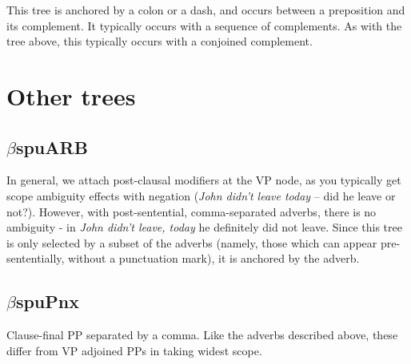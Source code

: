 This tree is anchored by a colon or a dash, and occurs between a 
preposition and its complement. It typically occurs with a sequence 
of complements. As with the tree above, this typically occurs with a 
conjoined complement. 
 
\beginsentences
{}\label{ex:459} 
\label{ex:460} 
\endsentences

 
\section{Other trees} 
 
\subsection{$\beta$spuARB} 
\label{post-adverb} 
 
In general, we attach post-clausal modifiers at the VP node, as you 
typically get scope ambiguity effects with negation ({\it John didn't leave today} -- did he leave or not?). However, with post-sentential, 
comma-separated adverbs, there is no ambiguity - in {\it John didn't leave, today} he definitely did not leave. Since this tree is only 
selected by a subset of the adverbs (namely, those which can appear 
pre-sententially, without a punctuation mark), it is anchored by the 
adverb. 
 
\beginsentences
{}\label{ex:461} 
\endsentences

 
 
\subsection{$\beta$spuPnx} 
\label{post-PP} 
 
Clause-final PP separated by a comma. Like the adverbs described 
above, these differ from VP adjoined PPs in taking widest scope. 
 
